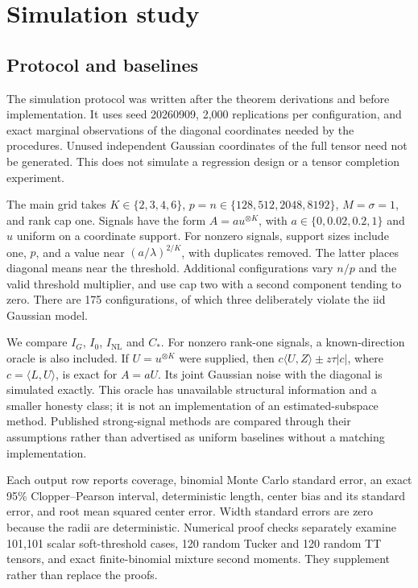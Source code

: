 \documentclass[11pt]{article}
\theoremstyle{remark}
\newcommand{\ip}[2]{\langle #1,#2\rangle}
\newcommand{\NL}{\mathrm{NL}}
\begin{document}
\section{Simulation study}\label{sec:sim}

\subsection{Protocol and baselines}
The simulation protocol was written after the theorem derivations and before implementation. It uses seed 20260909, 2,000 replications per configuration, and exact marginal observations of the diagonal coordinates needed by the procedures. Unused independent Gaussian coordinates of the full tensor need not be generated. This does not simulate a regression design or a tensor completion experiment.

The main grid takes $K\in\{2,3,4,6\}$, $p=n\in\{128,512,2048,8192\}$, $M=\sigma=1$, and rank cap one. Signals have the form $A=a u^{\otimes K}$, with $a\in\{0,0.02,0.2,1\}$ and $u$ uniform on a coordinate support. For nonzero signals, support sizes include one, $p$, and a value near $(a/\lambda)^{2/K}$, with duplicates removed. The latter places diagonal means near the threshold. Additional configurations vary $n/p$ and the valid threshold multiplier, and use cap two with a second component tending to zero. There are 175 configurations, of which three deliberately violate the iid Gaussian model.

We compare $I_G$, $I_0$, $I_{\NL}$ and $C_*$. For nonzero rank-one signals, a known-direction oracle is also included. If $U=u^{\otimes K}$ were supplied, then $c\ip UZ\pm z\tau|c|$, where $c=\ip LU$, is exact for $A=aU$. Its joint Gaussian noise with the diagonal is simulated exactly. This oracle has unavailable structural information and a smaller honesty class; it is not an implementation of an estimated-subspace method. Published strong-signal methods are compared through their assumptions rather than advertised as uniform baselines without a matching implementation.

Each output row reports coverage, binomial Monte Carlo standard error, an exact 95\% Clopper--Pearson interval, deterministic length, center bias and its standard error, and root mean squared center error. Width standard errors are zero because the radii are deterministic. Numerical proof checks separately examine 101,101 scalar soft-threshold cases, 120 random Tucker and 120 random TT tensors, and exact finite-binomial mixture second moments. They supplement rather than replace the proofs.
\end{document}
